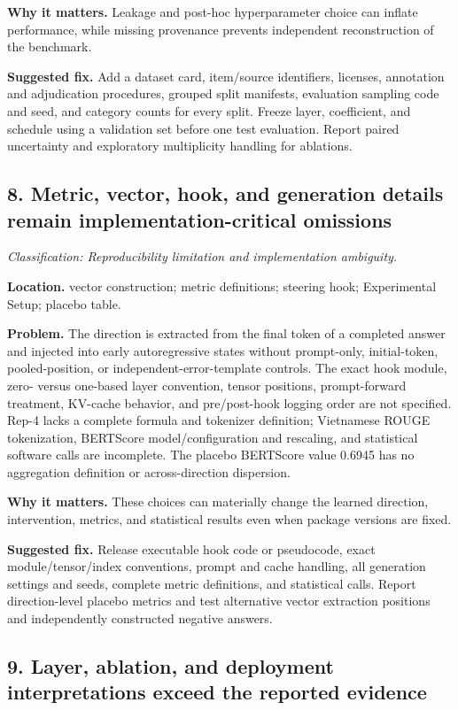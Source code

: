 \documentclass[11pt]{article}
\newcommand{\findinglabel}[1]{\textbf{#1}}
\newcommand{\classification}[1]{\textit{Classification: #1.}}
\begin{document}
\findinglabel{Why it matters.} Leakage and post-hoc hyperparameter choice can inflate performance, while missing provenance prevents independent reconstruction of the benchmark.

\findinglabel{Suggested fix.} Add a dataset card, item/source identifiers, licenses, annotation and adjudication procedures, grouped split manifests, evaluation sampling code and seed, and category counts for every split.  Freeze layer, coefficient, and schedule using a validation set before one test evaluation.  Report paired uncertainty and exploratory multiplicity handling for ablations.

\subsection*{8. Metric, vector, hook, and generation details remain implementation-critical omissions}

\classification{Reproducibility limitation and implementation ambiguity}

\findinglabel{Location.} vector construction; metric definitions; steering hook; Experimental Setup; placebo table.

\findinglabel{Problem.} The direction is extracted from the final token of a completed answer and injected into early autoregressive states without prompt-only, initial-token, pooled-position, or independent-error-template controls.  The exact hook module, zero- versus one-based layer convention, tensor positions, prompt-forward treatment, KV-cache behavior, and pre/post-hook logging order are not specified.  Rep-4 lacks a complete formula and tokenizer definition; Vietnamese ROUGE tokenization, BERTScore model/configuration and rescaling, and statistical software calls are incomplete.  The placebo BERTScore value 0.6945 has no aggregation definition or across-direction dispersion.

\findinglabel{Why it matters.} These choices can materially change the learned direction, intervention, metrics, and statistical results even when package versions are fixed.

\findinglabel{Suggested fix.} Release executable hook code or pseudocode, exact module/tensor/index conventions, prompt and cache handling, all generation settings and seeds, complete metric definitions, and statistical calls.  Report direction-level placebo metrics and test alternative vector extraction positions and independently constructed negative answers.

\subsection*{9. Layer, ablation, and deployment interpretations exceed the reported evidence}
\end{document}
